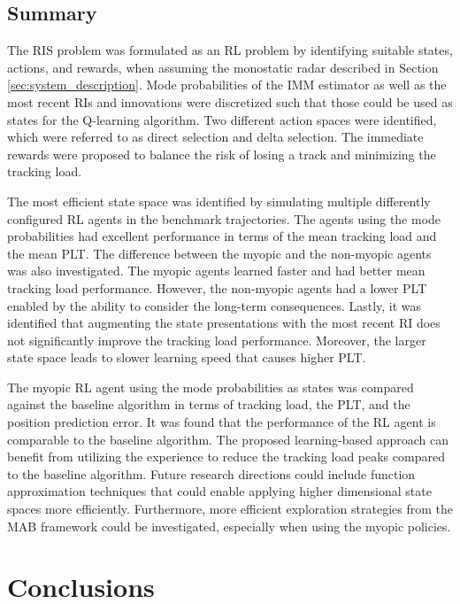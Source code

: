 \documentclass[english, 12pt, a4paper, elec, utf8, a-1b, online]{aaltothesis}
\begin{document}
\subsection{Summary}

The RIS problem was formulated as an RL problem by identifying suitable states, actions, and rewards, when assuming the monostatic radar described in Section \ref{sec:system_description}.
Mode probabilities of the IMM estimator as well as the most recent RIs and innovations were discretized such that those could be used as states for the Q-learning algorithm.
Two different action spaces were identified, which were referred to as direct selection and delta selection.
The immediate rewards were proposed to balance the risk of losing a track and minimizing the tracking load.  

The most efficient state space was identified by simulating multiple differently configured  RL agents in the benchmark trajectories.
The agents using the mode probabilities had excellent performance in terms of the mean tracking load and the mean PLT.
The difference between the myopic and the non-myopic agents was also investigated.
The myopic agents learned faster and had better mean tracking load performance.
However, the non-myopic agents had a lower PLT enabled by the ability to consider the long-term consequences. 
Lastly, it was identified that augmenting the state presentations with the most recent RI does not significantly improve the tracking load performance.
Moreover, the larger state space leads to slower learning speed that causes higher PLT.  

The myopic RL agent using the mode probabilities as states was compared against the baseline algorithm in terms of tracking load, the PLT, and the position prediction error.
It was found that the performance of the RL agent is comparable to the baseline algorithm.
The proposed learning-based approach can benefit from utilizing the experience to reduce the tracking load peaks compared to the baseline algorithm.
Future research directions could include function approximation techniques that could enable applying higher dimensional state spaces more efficiently. 
Furthermore, more efficient exploration strategies from the MAB framework could be investigated, especially when using the myopic policies.


\clearpage
\section{Conclusions} \label{sec:conclusions}
\end{document}
